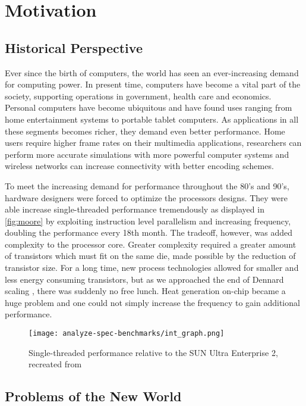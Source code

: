 
\section{Motivation}

\subsection{Historical Perspective}

Ever since the birth of computers, the world has seen an ever-increasing demand
for computing power. In present time, computers have become a vital part of the
society, supporting operations in government, health care and economics.
Personal computers have become ubiquitous and have found uses ranging from home
entertainment systems to portable tablet computers. As applications in all these
segments becomes richer, they demand even better performance. Home users require
higher frame rates on their multimedia applications, researchers can perform
more accurate simulations with more powerful computer systems and wireless
networks can increase connectivity with better encoding schemes.

To meet the increasing demand for performance throughout the 80's and 90's,
hardware designers were forced to optimize the processors designs. They were
able increase single-threaded performance tremendously as displayed in
\autoref{fig:moore} by exploiting instruction level parallelism and increasing
frequency, doubling the performance every 18th month. The tradeoff, however, was
added complexity to the processor core. Greater complexity required a greater
amount of transistors which must fit on the same die, made possible by the
reduction of transistor size. For a long time, new process technologies allowed
for smaller and less energy consuming transistors, but as we approached the end
of Dennard scaling \cite{dennard}, there was suddenly no free lunch. Heat
generation on-chip became a huge problem and one could not simply increase the
frequency to gain additional performance.

\begin{figure}
\texttt{[image: analyze-spec-benchmarks/int\_graph.png]}
\caption{Single-threaded performance relative to the SUN Ultra Enterprise 2,
recreated from \cite{preshing}}
\label{fig:moore}
\end{figure}

\subsection{Problems of the New World}

